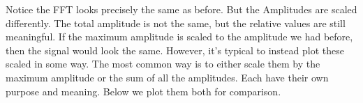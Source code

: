 Notice the FFT looks precisely the same as before. But the Amplitudes
are scaled differently. The total amplitude is not the same, but the
relative values are still meaningful. If the maximum amplitude is scaled
to the amplitude we had before, then the signal would look the same.
However, it's typical to instead plot these scaled in some way. The most
common way is to either scale them by the maximum amplitude or the sum
of all the amplitudes. Each have their own purpose and meaning. Below we
plot them both for comparison.

\begin{Shaded}
\begin{Highlighting}[]
\OperatorTok{=}\NormalTok{(}\NormalTok{, }\NormalTok{))}

\NormalTok{)}
\OperatorTok{/}\NormalTok{)}
\NormalTok{,}\NormalTok{)}
\NormalTok{,}\NormalTok{,}\NormalTok{))}

\NormalTok{)}
\NormalTok{)}
\NormalTok{)}

\OperatorTok{=}\OperatorTok{=}\OperatorTok{=}\StringTok{\textquotesingle{}{-}{-}\textquotesingle{}}\OperatorTok{=}\NormalTok{)}
\OperatorTok{=}\OperatorTok{=}\OperatorTok{=}\StringTok{\textquotesingle{}{-}{-}\textquotesingle{}}\OperatorTok{=}\NormalTok{)}


\NormalTok{)}
\OperatorTok{/}\NormalTok{)}
\NormalTok{,}\NormalTok{)}
\NormalTok{,}\NormalTok{,}\NormalTok{))}


\end{Highlighting}
\end{Shaded}
